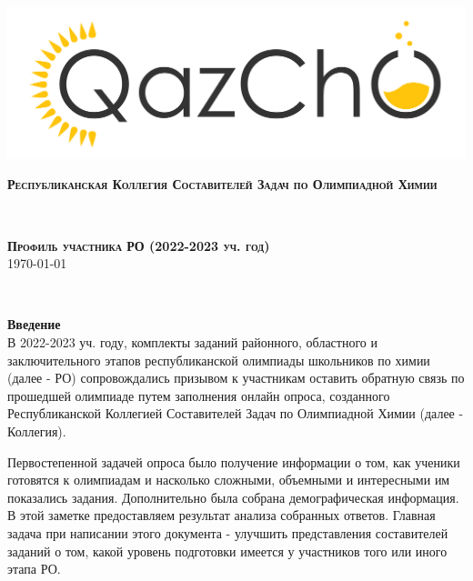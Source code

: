 \documentclass[12pt,openany]{extbook}
\begin{document}
\begin{titlepage}


\newcommand{\HRule}{\rule{\linewidth}{0.5mm}} %

\center %

\includegraphics[width=0.5\linewidth]{logo_color.jpg}\\[1.0cm]


\begin{minipage}{0.5\textwidth}
\begin{flushleft} \large
\textsc{\textbf{Республиканская Коллегия Составителей Задач по Олимпиадной Химии}}
\end{flushleft}
\end{minipage}
~
\begin{minipage}{0.4\textwidth}
\begin{flushright} \large
\textsc{\textbf{Профиль участника РО (2022-2023 уч. год)}}\\
\textsc{\today}
\end{flushright}
\end{minipage}\\[2.0cm]

\begin{minipage}{0.93\textwidth}
\begin{flushleft}
  

\textbf{\large Введение}\\[0.5cm]
В 2022-2023 уч. году, комплекты заданий районного, областного и заключительного этапов республиканской олимпиады школьников по химии (далее - РО) сопровождались призывом к участникам оставить обратную связь по прошедшей олимпиаде путем заполнения онлайн опроса, созданного Республиканской Коллегией Составителей Задач по Олимпиадной Химии (далее - Коллегия). 

Первостепенной задачей опроса было получение информации о том, как ученики готовятся к олимпиадам и насколько сложными, объемными и интересными им показались задания. Дополнительно была собрана демографическая информация. В этой заметке предоставляем результат анализа собранных ответов. Главная задача при написании этого документа - улучшить представления составителей заданий о том, какой уровень подготовки имеется у участников того или иного этапа РО. 
\end{flushleft}
\end{minipage}


\end{titlepage}
\end{document}
